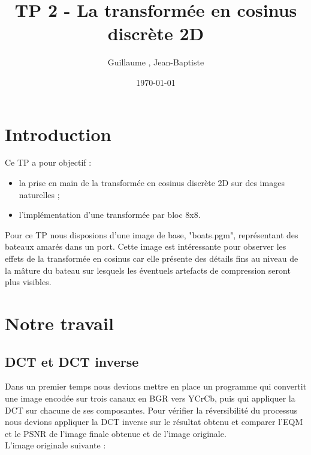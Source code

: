 \documentclass[12pt]{report}
\title{TP 2 - La transformée en cosinus discrète 2D}
\author{Guillaume \bsc{Versal}, Jean-Baptiste \bsc{Morice}}
\date{\today}
\begin{document}
\maketitle

\tableofcontents

\newpage
\section*{Introduction}

Ce TP a pour objectif :
\begin{itemize}
\item la prise en main de la transformée en cosinus discrète 2D sur des images naturelles ;
\item l'implémentation d'une transformée par bloc 8x8.\\
\end{itemize}
Pour ce TP nous disposions d'une image de base, "boats.pgm", représentant des bateaux amarés dans un port. Cette image est intéressante pour observer les effets de la transformée en cosinus car elle présente des détails fins au niveau de la mâture du bateau sur lesquels les éventuels artefacts de compression seront plus visibles.


\newpage
\section{Notre travail}

\subsection{DCT et DCT inverse}
Dans un premier temps nous devions mettre en place un programme qui convertit une image encodée sur trois canaux en BGR vers YCrCb, puis qui appliquer la DCT sur chacune de ses composantes. Pour vérifier la réversibilité du processus nous devions appliquer la DCT inverse sur le résultat obtenu et comparer l'EQM et le PSNR de l'image finale obtenue et de l'image originale.\\

L'image originale suivante :
\end{document}
